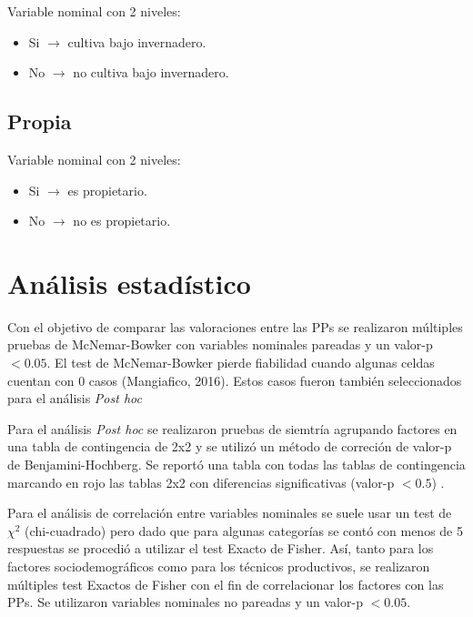 \documentclass[a4paper, nobind]{templates/ociamthesis}
\providecommand{\tightlist}{%
  \setlength{\itemsep}{0pt}\setlength{\parskip}{0pt}}
\begin{document}
Variable nominal con 2 niveles:

\begin{itemize}
\tightlist
\item
  Si \(\rightarrow\) cultiva bajo invernadero.
\item
  No \(\rightarrow\) no cultiva bajo invernadero.
\end{itemize}

\hypertarget{propia}{%
\subsection{Propia}\label{propia}}

Variable nominal con 2 niveles:

\begin{itemize}
\tightlist
\item
  Si \(\rightarrow\) es propietario.
\item
  No \(\rightarrow\) no es propietario.
\end{itemize}

\hypertarget{anuxe1lisis-estaduxedstico}{%
\section{Análisis estadístico}\label{anuxe1lisis-estaduxedstico}}

Con el objetivo de comparar las valoraciones entre las PPs se realizaron múltiples pruebas de McNemar-Bowker con variables nominales pareadas y un valor-p \(< 0.05\).
El test de McNemar-Bowker pierde fiabilidad cuando algunas celdas cuentan con 0 casos (Mangiafico, 2016).
Estos casos fueron también seleccionados para el análisis \emph{Post hoc}

Para el análisis \emph{Post hoc} se realizaron pruebas de siemtría agrupando factores en una tabla de contingencia de 2x2 y se utilizó un método de correción de valor-p de Benjamini-Hochberg.
Se reportó una tabla con todas las tablas de contingencia marcando en rojo las tablas 2x2 con diferencias significativas (valor-p \(<0.5\)) .

Para el análisis de correlación entre variables nominales se suele usar un test de \({\chi}^2\) (chi-cuadrado) pero dado que para algunas categorías se contó con menos de 5 respuestas se procedió a utilizar el test Exacto de Fisher.
Así, tanto para los factores sociodemográficos como para los técnicos productivos, se realizaron múltiples test Exactos de Fisher con el fin de correlacionar los factores con las PPs.
Se utilizaron variables nominales no pareadas y un valor-p \(< 0.05\).
\end{document}
